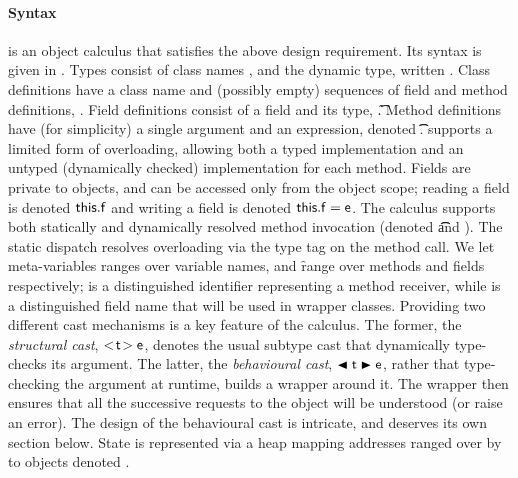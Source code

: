 \documentclass[acmlarge, anonymous, authordraft, review]{acmart} %
\begin{document}
\paragraph{Syntax}  
\kafka is an object calculus that satisfies the above design
requirement. Its syntax is given in .  Types consist of class
names \C, \D and the dynamic type, written \any.  Class definitions have a
class name and (possibly empty) sequences of field and method definitions,
\Class{}. Field definitions consist of a field and its
type, \Fdef\f\t. Method definitions have (for simplicity) a single argument
and an expression, denoted \Mdef\m\x\t\t\e.  \kafka supports a limited form
of overloading, allowing both a typed implementation and an untyped
(dynamically checked) implementation for each method.  Fields are private to
objects, and can be accessed only from the object scope; reading a field is
denoted \(\FRead\f\) and writing a field is denoted \(\FWrite\f\e \).  The
calculus supports both statically and dynamically resolved method invocation
(denoted \KCall\e\m\e\t\t and \DynCall\e\m\e).  The static dispatch resolves
overloading via the type tag on the method call.  We let meta-variables \x
ranges over variable names, \m and \f range over methods and fields
respectively; \this is a distinguished identifier representing a method
receiver, while \that is a distinguished field name that will be used in
wrapper classes.  Providing two different cast mechanisms is a key feature
of the calculus.  The former, the \emph{structural cast}, \(\SubCast\t\e\),
denotes the usual subtype cast that dynamically type-checks its argument.
The latter, the \emph{behavioural cast}, \(\BehCast\t\e\), rather that
type-checking the argument at runtime, builds a wrapper around it.  The
wrapper then ensures that all the successive requests to the object will be
understood (or raise an error). The design of the behavioural cast is
intricate, and deserves its own section below.
State is represented via a heap \s mapping addresses ranged over by \a
to objects denoted \hspace{-1mm}\obj{}.
\end{document}
